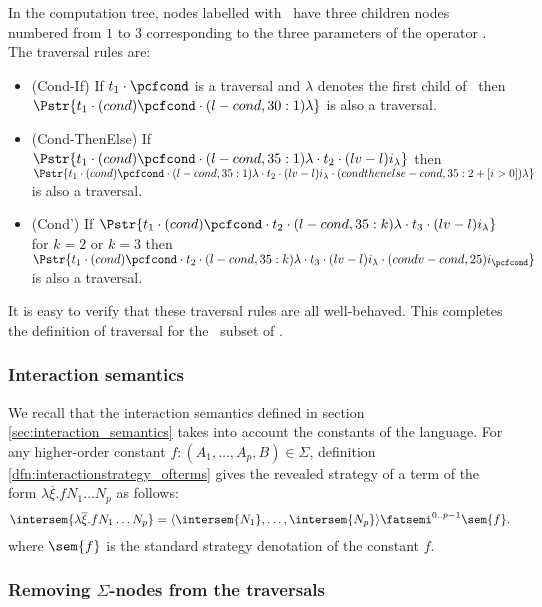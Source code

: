 \noindent In the computation tree, nodes labelled with \pcfcond\
have three children nodes numbered from $1$ to $3$ corresponding to
the three parameters of the operator \pcfcond. The traversal rules
are:
\begin{itemize}
\item (Cond-If) If $t_1 \cdot \pcfcond$ is a traversal and $\lambda$ denotes the first child of \pcfcond\ then
$\Pstr{ t_1 \cdot (cond){{\pcfcond}} \cdot (l-cond,30:1){\lambda}}$
 is also a traversal.

\item (Cond-ThenElse) If
$\Pstr{t_1 \cdot (cond){\pcfcond} \cdot (l-cond,35:1){\lambda} \cdot t_2
\cdot (lv-l){i_{\lambda}}} $
then $\Pstr{t_1 \cdot
(cond){\pcfcond} \cdot (l-cond,35:1){\lambda} \cdot t_2 \cdot
(lv-l){i_{\lambda}} \cdot (condthenelse-cond,35:{2+[i>0]}){\lambda} }
$
is also a traversal.



\item (Cond') If
$\Pstr{t_1 \cdot (cond){\pcfcond} \cdot t_2 \cdot (l-cond,35:k){\lambda}
\cdot t_3 \cdot (lv-l){i_{\lambda}}}$
 for $k=2$ or $k=3$ then  $\Pstr{ t_1 \cdot
(cond){\pcfcond} \cdot t_2 \cdot (l-cond,35:k){\lambda} \cdot t_3
\cdot (lv-l){i_{\lambda}} \cdot (condv-cond,25){i_{\pcfcond}}}$
 is also a traversal.
\end{itemize}
It is easy to verify that these traversal rules are all
well-behaved. This completes the definition of traversal for the
\pcf\ subset of \ialgol.

\subsubsection{Interaction semantics}
We recall that the interaction semantics defined in section
\ref{sec:interaction_semantics} takes into account the constants
of the language. For any higher-order constant $f : (A_1,\ldots,A_p,B) \in \Sigma$, definition \ref{dfn:interactionstrategy_ofterms} gives the  revealed strategy of a term of the form $\lambda \overline{\xi}. f N_1 \ldots
N_p$ as follows:
$$ \intersem{\lambda \overline{\xi}. f N_1 \ldots N_p} = \langle \intersem{N_1}, \ldots, \intersem{N_p} \rangle \fatsemi^{0..p-1} \sem{f}.$$
where $\sem{f}$ is the standard strategy denotation of the constant $f$.


\subsubsection{Removing $\Sigma$-nodes from the traversals}


